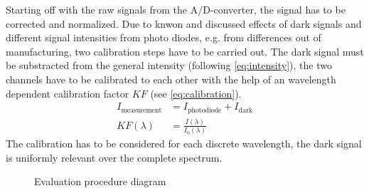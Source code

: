 Starting off with the raw signals from the A/D-converter, the signal has to be corrected and normalized. Due to knwon and discussed effects of dark signals and different signal intensities from photo diodes, e.g. from differences out of manufacturing, two calibration steps have to be carried out. The dark signal must be substracted from the general intensity (following \autoref{eq:intensity}), the two channels have to be calibrated to each other with the help of an wavelength dependent calibration factor $KF$ (see \autoref{eq:calibration}).
\begin{align}
    I_\mathrm{measurement}&=I_\mathrm{photodiode}+I_\mathrm{dark} \label{eq:intensity} \\[12pt]
    KF(\lambda)&=\frac{I(\lambda)}{I_\mathrm{0}(\lambda)} \label{eq:calibration}
\end{align}
The calibration has to be considered for each discrete wavelength, the dark signal is uniformly relevant over the complete spectrum.

\begin{figure}
    \centering
    \vspace{12pt}
    \vspace{6pt}
    \caption{Evaluation procedure diagram}
    \label{fig:scheme-eval}
\end{figure}

